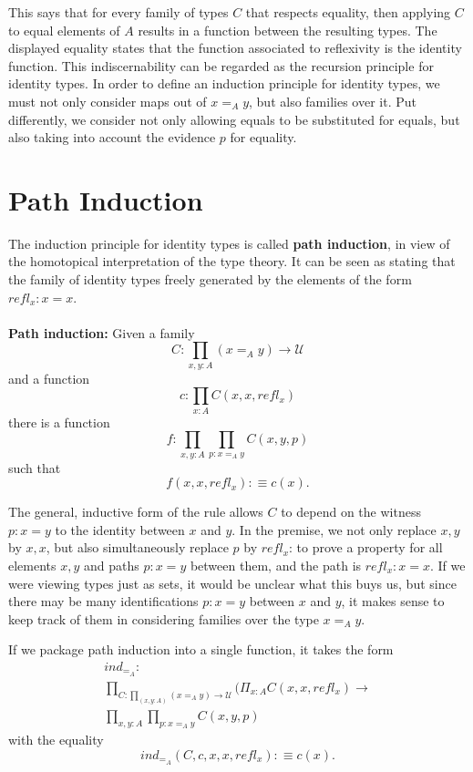 \documentclass[letterpaper, 10 pt, conference]{ieeeconf}  %
\begin{document}
This says that for every family of types $C$ that respects equality, then applying $C$ to equal elements of $A$ results in a function between the resulting types. The displayed equality states that the function associated to reflexivity is the identity function. This indiscernability can be regarded as the recursion principle for identity types. In order to define an induction principle for identity types, we must not only consider maps out of $x =_A y$, but also families over it. Put differently, we consider not only allowing equals to be substituted for equals, but also taking into account the evidence $p$ for equality.

\section{Path Induction}
The induction principle for identity types is called \textbf{path induction}, in view of the homotopical interpretation of the type theory. It can be seen as stating that the family of identity types freely generated by the elements of the form $refl_x : x = x$.
\\
\\
\textbf{Path induction:} Given a family
\begin{equation*}
    C : \prod_{x,y: A} (x =_A y) \rightarrow \mathcal{U}
\end{equation*}
and a function 
\begin{equation*}
    c : \prod_{x : A} C(x,x,refl_x)
\end{equation*}
there is a function 
\begin{equation*}
    f : \prod_{x,y: A} \prod_{p: x =_A y} C(x,y,p)
\end{equation*}
such that
\begin{equation*}
    f(x,x,refl_x) :\equiv c(x).
\end{equation*}

The general, inductive form of the rule allows $C$ to depend on the witness $p : x = y$ to the identity between $x$ and $y$. In the premise, we not only replace $x,y$ by $x,x$, but also simultaneously replace $p$ by $refl_x$: to prove a property for all elements $x,y$ and paths $p : x = y$ between them, and the path is $refl_x : x = x$. If we were viewing types just as sets, it would be unclear what this buys us, but since there may be many identifications $p : x = y$ between $x$ and $y$, it makes sense to keep track of them in considering families over the type $x =_A y$. 

If we package path induction into a single function, it takes the form 
\begin{multline}
    ind_{=_A} : \\
    \prod_{C : \prod_{(x,y : A)} (x =_A y) \rightarrow \mathcal{U}} (\Pi_{x : A} C(x,x,refl_x) \rightarrow \\
    \prod_{x,y:A} \prod_{p : x =_A y} C(x,y,p)
\end{multline}
with the equality 
\begin{equation}
    ind_{=_A}(C,c,x,x,refl_x) :\equiv c(x).
\end{equation}
\end{document}
